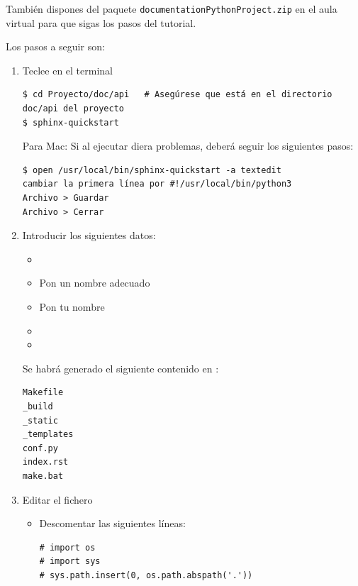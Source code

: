 También dispones del paquete {\tt documentationPythonProject.zip} en el aula virtual para que sigas los pasos del tutorial.

Los pasos a seguir son:

\begin{enumerate}[nosep]
\item Teclee en el terminal
\begin{Verbatim}
$ cd Proyecto/doc/api   # Asegúrese que está en el directorio doc/api del proyecto
$ sphinx-quickstart
\end{Verbatim}

Para Mac: Si al ejecutar  diera problemas, deberá seguir los siguientes pasos:
\begin{Verbatim}
$ open /usr/local/bin/sphinx-quickstart -a textedit
cambiar la primera línea por #!/usr/local/bin/python3
Archivo > Guardar
Archivo > Cerrar 
\end{Verbatim}



\item Introducir los siguientes datos:
	\begin{itemize}[nosep]
	\item {} 
	\item {} Pon un nombre adecuado 
	\item {} Pon tu nombre 
	\item {} 
	\item \cm[magenta]{Lenguaje del proyecto [en]:]}  
	\end{itemize}

Se habrá generado el siguiente contenido en :

\begin{Verbatim}
Makefile
_build
_static
_templates
conf.py
index.rst
make.bat
\end{Verbatim}

\item Editar el fichero  

\begin{itemize}
\item Descomentar las siguientes líneas:
\begin{Verbatim}
# import os
# import sys
# sys.path.insert(0, os.path.abspath('.'))
\end{Verbatim}


\end{itemize}
\end{enumerate}
